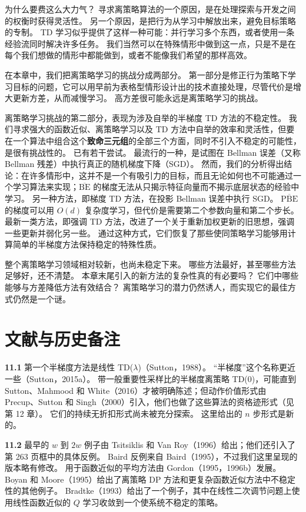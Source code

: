 \documentclass[UTF8, 12pt, fontset=fandol, oneside]{ctexart}
\begin{document}
为什么要费这么大力气？
寻求离策略算法的一个原因，是在处理探索与开发之间的权衡时获得灵活性。
另一个原因，是把行为从学习中解放出来，避免目标策略的专制。
TD 学习似乎提供了这样一种可能：并行学习多个东西，或者使用一条经验流同时解决许多任务。
我们当然可以在特殊情形中做到这一点，只是不是在每个我们想做的情形中都能做到，或者不能像我们希望的那样高效。

在本章中，我们把离策略学习的挑战分成两部分。
第一部分是修正行为策略下学习目标的问题，它可以用早前为表格型情形设计出的技术直接处理，尽管代价是增大更新方差，从而减慢学习。
高方差很可能永远是离策略学习的挑战。

离策略学习挑战的第二部分，表现为涉及自举的半梯度 TD 方法的不稳定性。
我们寻求强大的函数近似、离策略学习以及 TD 方法中自举的效率和灵活性，但要在一个算法中组合这个\textbf{致命三元组}的全部三个方面，同时不引入不稳定的可能性，是很有挑战性的。
已有若干尝试。
最流行的一种，是试图在 Bellman 误差（又称 Bellman 残差）中执行真正的随机梯度下降（SGD）。
然而，我们的分析得出结论：在许多情形中，这并不是一个有吸引力的目标，而且无论如何也不可能通过一个学习算法来实现；$\overline{\mathrm{BE}}$ 的梯度无法从只揭示特征向量而不揭示底层状态的经验中学习。
另一种方法，即梯度 TD 方法，在投影 Bellman 误差中执行 SGD。
$\overline{\mathrm{PBE}}$ 的梯度可以用 $O(d)$ 复杂度学习，但代价是需要第二个参数向量和第二个步长。
最新一类方法，即强调 TD 方法，改进了一个关于重新加权更新的旧思想，强调一些更新并弱化另一些。
通过这种方式，它们恢复了那些使同策略学习能够用计算简单的半梯度方法保持稳定的特殊性质。

整个离策略学习领域相对较新，也尚未稳定下来。
哪些方法最好，甚至哪些方法足够好，还不清楚。
本章末尾引入的新方法的复杂性真的有必要吗？
它们中哪些能够与方差降低方法有效结合？
离策略学习的潜力仍然诱人，而实现它的最佳方式仍然是一个谜。

\section*{文献与历史备注}

\noindent\textbf{11.1}
第一个半梯度方法是线性 TD($\lambda$)（Sutton，1988）。
“半梯度”这个名称更近一些（Sutton，2015a）。
带一般重要性采样比的半梯度离策略 TD(0)，可能直到 Sutton、Mahmood 和 White（2016）才被明确陈述；但动作价值形式由 Precup、Sutton 和 Singh（2000）引入，他们也做了这些算法的资格迹形式（见第 12 章）。
它们的持续无折扣形式尚未被充分探索。
这里给出的 $n$ 步形式是新的。

\noindent\textbf{11.2}
最早的 $w$ 到 $2w$ 例子由 Tsitsiklis 和 Van Roy（1996）给出；他们还引入了第 263 页框中的具体反例。
Baird 反例来自 Baird（1995），不过我们这里呈现的版本略有修改。
用于函数近似的平均方法由 Gordon（1995，1996b）发展。
Boyan 和 Moore（1995）给出了离策略 DP 方法和更复杂函数近似方法中不稳定性的其他例子。
Bradtke（1993）给出了一个例子，其中在线性二次调节问题上使用线性函数近似的 $Q$ 学习收敛到一个使系统不稳定的策略。
\end{document}

